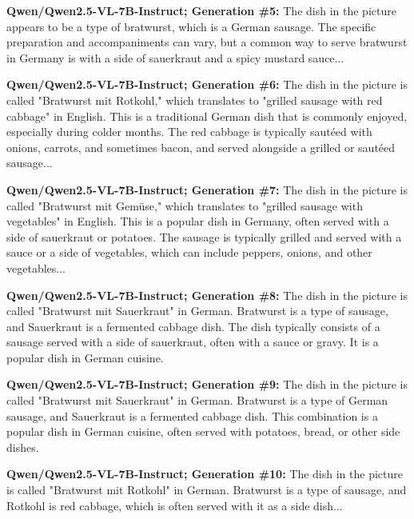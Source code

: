 \documentclass{article} %
\newcommand{\known}[1]{\textcolor{KnownGreen}{#1}}
\begin{document}
\begin{tcolorbox}[
    colback=white,
    colframe=lightblue,
    arc=10pt,
    boxrule=3pt,
    left=10pt,
    right=10pt,
    top=10pt,
    bottom=10pt
]
\vspace{8pt}
\noindent\faRobot \hspace{5pt} \textbf{Qwen/Qwen2.5-VL-7B-Instruct; Generation \#5:}
The dish in the picture appears to be a type of \known{bratwurst}, which is a German sausage. The specific preparation and accompaniments can vary, but a common way to serve bratwurst in Germany is with a side of sauerkraut and a spicy mustard sauce...

\vspace{8pt}
\noindent\faRobot \hspace{5pt} \textbf{Qwen/Qwen2.5-VL-7B-Instruct; Generation \#6:}
The dish in the picture is called "\known{Bratwurst} mit Rotkohl," which translates to "grilled sausage with red cabbage" in English. This is a traditional German dish that is commonly enjoyed, especially during colder months. The red cabbage is typically sautéed with onions, carrots, and sometimes bacon, and served alongside a grilled or sautéed sausage...

\vspace{8pt}
\noindent\faRobot \hspace{5pt} \textbf{Qwen/Qwen2.5-VL-7B-Instruct; Generation \#7:}
The dish in the picture is called "\known{Bratwurst} mit Gemüse," which translates to "grilled sausage with vegetables" in English. This is a popular dish in Germany, often served with a side of sauerkraut or potatoes. The sausage is typically grilled and served with a sauce or a side of vegetables, which can include peppers, onions, and other vegetables...

\vspace{8pt}
\noindent\faRobot \hspace{5pt} \textbf{Qwen/Qwen2.5-VL-7B-Instruct; Generation \#8:}
The dish in the picture is called "Bratwurst mit Sauerkraut" in German. \known{Bratwurst} is a type of sausage, and Sauerkraut is a fermented cabbage dish. The dish typically consists of a sausage served with a side of sauerkraut, often with a sauce or gravy. It is a popular dish in German cuisine.

\vspace{8pt}
\noindent\faRobot \hspace{5pt} \textbf{Qwen/Qwen2.5-VL-7B-Instruct; Generation \#9:}
The dish in the picture is called "Bratwurst mit Sauerkraut" in German. \known{Bratwurst} is a type of German sausage, and Sauerkraut is a fermented cabbage dish. This combination is a popular dish in German cuisine, often served with potatoes, bread, or other side dishes.

\vspace{8pt}
\noindent\faRobot \hspace{5pt} \textbf{Qwen/Qwen2.5-VL-7B-Instruct; Generation \#10:}
The dish in the picture is called "Bratwurst mit Rotkohl" in German. \known{Bratwurst} is a type of sausage, and Rotkohl is red cabbage, which is often served with it as a side dish... 

\end{tcolorbox}
\end{document}
